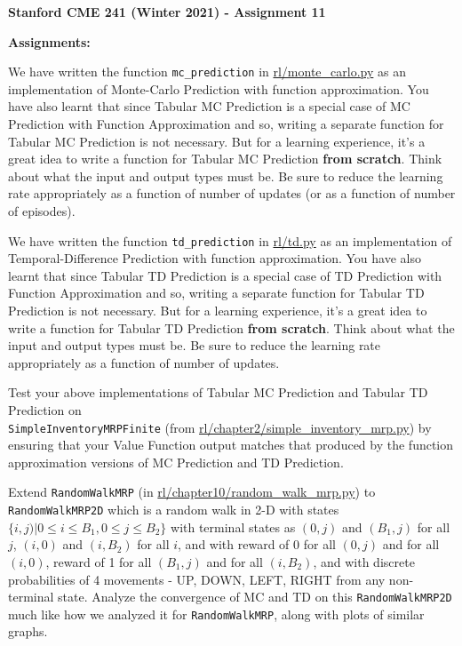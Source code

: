 \documentclass[12pt]{exam}
\begin{document}
\begin{center}
{\large {\bf Stanford CME 241 (Winter 2021) - Assignment 11}}
\end{center}
 
{\large{\bf Assignments:}}
\begin{questions}
\question We have written the function \lstinline{mc_prediction} in \href{https://github.com/TikhonJelvis/RL-book/blob/master/rl/monte_carlo.py}{rl\//monte\_carlo.py} as an implementation of Monte-Carlo Prediction with function approximation. You have also learnt that since Tabular MC Prediction is a special case of MC Prediction with Function Approximation and so, writing a separate function for Tabular MC Prediction is not necessary. But for a learning experience, it's a great idea to write a function for Tabular MC Prediction {\bf from scratch}. Think about what the input and output types must be. Be sure to reduce the learning rate appropriately as a function of number of updates (or as a function of number of episodes). 

\question We have written the function \lstinline{td_prediction} in \href{https://github.com/TikhonJelvis/RL-book/blob/master/rl/monte_carlo.py}{rl\//td.py} as an implementation of Temporal-Difference Prediction with function approximation. You have also learnt that since Tabular TD Prediction is a special case of TD Prediction with Function Approximation and so, writing a separate function for Tabular TD Prediction is not necessary. But for a learning experience, it's a great idea to write a function for Tabular TD Prediction {\bf from scratch}. Think about what the input and output types must be. Be sure to reduce the learning rate appropriately as a function of number of updates. 

\question Test your above implementations of Tabular MC Prediction and Tabular TD Prediction on \\\lstinline{SimpleInventoryMRPFinite} (from \href{https://github.com/TikhonJelvis/RL-book/blob/master/rl/chapter2/simple_inventory_mrp.py}{rl\//chapter2\//simple\_inventory\_mrp.py}) by ensuring that your Value Function output matches that produced by the function approximation versions of MC Prediction and TD Prediction.

\question Extend \lstinline{RandomWalkMRP} (in \href{https://github.com/TikhonJelvis/RL-book/blob/master/rl/chapter10/random_walk_mrp.py}{rl\//chapter10\//random\_walk\_mrp.py}) to \lstinline{RandomWalkMRP2D} which is a random walk in 2-D with states $\{i, j) | 0 \leq i \leq B_1, 0 \leq j \leq B_2\}$ with terminal states as $(0, j)$ and $(B_1, j)$ for all $j$, $(i, 0)$ and $(i, B_2)$ for all $i$, and with reward of 0 for all $(0, j)$ and for all $(i, 0)$, reward of 1 for all $(B_1, j)$ and for all $(i, B_2)$, and with discrete probabilities of 4 movements - UP, DOWN, LEFT, RIGHT from any non-terminal state. Analyze the convergence of MC and TD on this \lstinline{RandomWalkMRP2D} much like how we analyzed it for \lstinline{RandomWalkMRP}, along with plots of similar graphs.

\end{questions}
\end{document}
